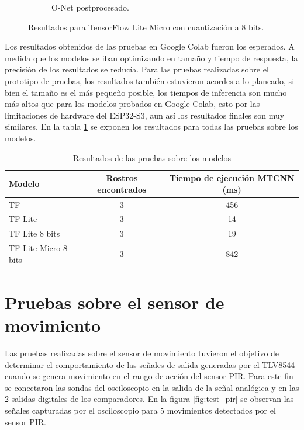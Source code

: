 \begin{figure}[!htpb]
\begin{subfigure}[b]{0.28\textwidth}
         \caption{O-Net postprocesado.}
         \label{fig:2de3}
     \end{subfigure}
     \hfill
        \caption{Resultados para TensorFlow Lite Micro con cuantización a 8 bits.}
        \label{fig:test_tflm}
\end{figure}

Los resultados obtenidos de las pruebas en Google Colab fueron los esperados. A medida que los modelos se iban optimizando en tamaño y tiempo de respuesta, la precisión de los resultados se reducía. Para las pruebas realizadas sobre el prototipo de pruebas, los resultados también estuvieron acordes a lo planeado, si bien el tamaño es el más pequeño posible, los tiempos de inferencia son mucho más altos que para los modelos probados en Google Colab, esto por las limitaciones de hardware del ESP32-S3, aun así los resultados finales son muy similares. En la tabla \ref{tab:test_tf_models} se exponen los resultados para todas las pruebas sobre los modelos.

\begin{table}[h]
	\centering
	\caption[Resultados de las pruebas sobre los modelos]{Resultados de las pruebas sobre los modelos}
	\begin{tabular}{lcc}   
		\toprule
		\textbf{Modelo} & \textbf{Rostros encontrados} & \textbf{Tiempo de ejecución MTCNN (ms)} \\
		\midrule
		TF & 3 & 456 \\
		TF Lite & 3 & 14 \\
		TF Lite 8 bits & 3 & 19 \\
		TF Lite Micro 8 bits & 3 & 842 \\
		\bottomrule
		\hline
	\end{tabular}
	\label{tab:test_tf_models}
\end{table}

\section{Pruebas sobre el sensor de movimiento}
Las pruebas realizadas sobre el sensor de movimiento tuvieron el objetivo de determinar el comportamiento de las señales de salida generadas por el TLV8544 cuando se genera movimiento en el rango de acción del sensor PIR. Para este fin se conectaron las sondas del osciloscopio en la salida de la señal analógica y en las 2 salidas digitales de los comparadores. En la figura \ref{fig:test_pir} se observan las señales capturadas por el osciloscopio para 5 movimientos detectados por el sensor PIR.

